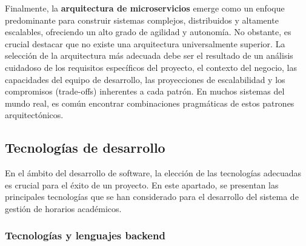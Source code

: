 Finalmente, la \textbf{arquitectura de microservicios} emerge como un enfoque predominante para construir sistemas complejos, distribuidos y altamente escalables, ofreciendo un alto grado de agilidad y autonomía. No obstante, es crucial destacar que no existe una arquitectura universalmente superior. La selección de la arquitectura más adecuada debe ser el resultado de un análisis cuidadoso de los requisitos específicos del proyecto, el contexto del negocio, las capacidades del equipo de desarrollo, las proyecciones de escalabilidad y los compromisos (trade-offs) inherentes a cada patrón. En muchos sistemas del mundo real, es común encontrar combinaciones pragmáticas de estos patrones arquitectónicos.

\subsection{Tecnologías de desarrollo}

En el ámbito del desarrollo de software, la elección de las tecnologías adecuadas es crucial para el éxito de un proyecto. En este apartado, se presentan las principales tecnologías que se han considerado para el desarrollo del sistema de gestión de horarios académicos.

\subsubsection{Tecnologías y lenguajes backend}

